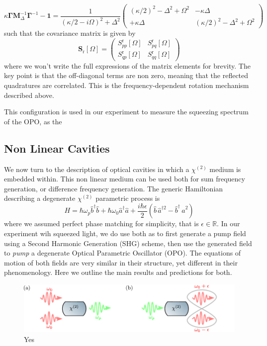 \begin{equation*}
\kappa \mathbf{\Gamma}  \mathbf{M}^{-1}_\Delta \mathbf{\Gamma}^{-1} - \mathbf{1} = \frac{1}{(\kappa/2 - i\Omega)^{2}+\Delta^{2}}
\begin{pmatrix}
      (\kappa/2)^2 - \Delta^2 + \Omega^2  & - \kappa \Delta  \\[6pt]
      + \kappa \Delta  & ( \kappa/2)^2 - \Delta^2 + \Omega^2
\end{pmatrix}
\end{equation*}
such that the covariance matrix is given by
\begin{equation}
  \mathbf{S}_{\mathrm{r}}[\Omega] = \begin{pmatrix}
    S_{pp}^{\mathrm{r}}[\Omega] & S_{pq}^{\mathrm{r}}[\Omega] \\[6pt]
    S_{qp}^{\mathrm{r}}[\Omega] & S_{qq}^{\mathrm{r}}[\Omega]
  \end{pmatrix}
\end{equation}
where we won't write the full expressions of the matrix elements for brevity. The key point is that the off-diagonal terms are non zero, meaning that the reflected quadratures are correlated. This is the frequency-dependent rotation mechanism described above.

This configuration is used in our experiment to measure the squeezing spectrum of the OPO, as the




\subsection{Non Linear Cavities}
We now turn to the description of optical cavities in which a $\chi^{(2)}$ medium is embedded within. This non linear medium can be used both for sum frequency generation, or difference frequency generation. The generic Hamiltonian describing a  degenerate $\chi^{(2)}$ parametric process is 
\begin{equation}
  H = \hbar \omega_p \hat{b}^{\dagger}\hat{b} + \hbar \omega_0 \hat{a}^\dagger \hat{a} + \frac{i\hbar\epsilon}{2}( \hat{b} \, \hat{a}^{\dagger2} - \hat{b}^\dagger \, \hat{a}^2)
\end{equation}
where we assumed perfect phase matching for simplicity, that is $\epsilon \in\mathbb{R}$. In our experiment wih squeezed light, we do use both as to first generate a pump field using a Second Harmonic Generation (SHG) scheme, then use the generated field to \textit{pump} a degenerate Optical Parametric Oscillator (OPO). The equations of motion of both fields are very similar in their structure, yet different in their phenomenology. Here we outline the main results and predictions for both. 
\begin{figure}
\centering
\includegraphics[width=\textwidth]{./chap2/fig/schema_SHG_OPO_2photons.pdf}
\caption{Yes} 
\end{figure}


